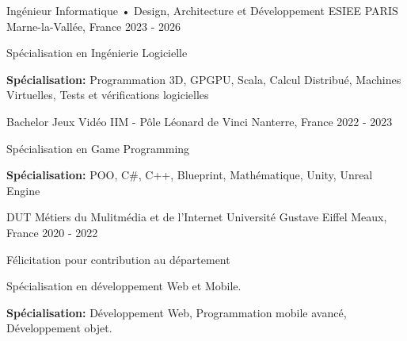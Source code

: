 

\begin{cventries}

  \cventry
    {Ingénieur Informatique • Design, Architecture et Développement} %
    {ESIEE PARIS} %
    {Marne-la-Vallée, France} %
    {2023 - 2026} %
    {
      \begin{cvitems} %
        \item {Spécialisation en Ingénierie Logicielle}
        \item {\textbf{Spécialisation:} Programmation 3D, GPGPU, Scala, Calcul Distribué, Machines Virtuelles, Tests et vérifications logicielles}
      \end{cvitems}
    }
    
  \cventry
    {Bachelor Jeux Vidéo} %
    {IIM - Pôle Léonard de Vinci} %
    {Nanterre, France} %
    {2022 - 2023} %
    {
      \begin{cvitems} %
        \item {Spécialisation en Game Programming}
        \item {\textbf{Spécialisation:} POO, C\#, C++, Blueprint, Mathématique, Unity, Unreal Engine}
      \end{cvitems}
    }
    
  \cventry
    {DUT Métiers du Mulitmédia et de l'Internet} %
    {Université Gustave Eiffel} %
    {Meaux, France} %
    {2020 - 2022} %
    {
      \begin{cvitems} %
        \item {Félicitation pour contribution au département}
        \item {Spécialisation en développement Web et Mobile.}
        \item {\textbf{Spécialisation:} Développement Web, Programmation mobile avancé, Développement objet.}
      \end{cvitems}
    }
    

\end{cventries}
